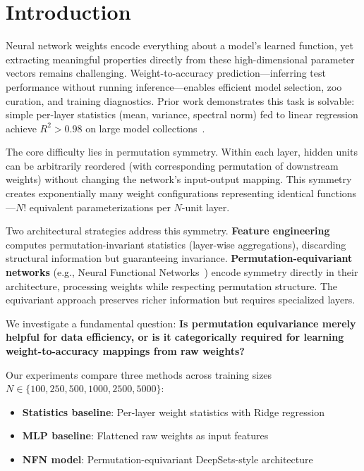 \section{Introduction}

Neural network weights encode everything about a model's learned function, yet extracting meaningful properties directly from these high-dimensional parameter vectors remains challenging. Weight-to-accuracy prediction---inferring test performance without running inference---enables efficient model selection, zoo curation, and training diagnostics. Prior work demonstrates this task is solvable: simple per-layer statistics (mean, variance, spectral norm) fed to linear regression achieve $R^2 > 0.98$ on large model collections~\cite{unterthiner2020predicting}.

The core difficulty lies in permutation symmetry. Within each layer, hidden units can be arbitrarily reordered (with corresponding permutation of downstream weights) without changing the network's input-output mapping. This symmetry creates exponentially many weight configurations representing identical functions---$N!$ equivalent parameterizations per $N$-unit layer.

Two architectural strategies address this symmetry. \textbf{Feature engineering} computes permutation-invariant statistics (layer-wise aggregations), discarding structural information but guaranteeing invariance. \textbf{Permutation-equivariant networks} (e.g., Neural Functional Networks~\cite{zhou2023neural}) encode symmetry directly in their architecture, processing weights while respecting permutation structure. The equivariant approach preserves richer information but requires specialized layers.

We investigate a fundamental question: \textbf{Is permutation equivariance merely helpful for data efficiency, or is it categorically required for learning weight-to-accuracy mappings from raw weights?}

Our experiments compare three methods across training sizes $N \in \{100, 250, 500, 1000, 2500, 5000\}$:
\begin{itemize}
    \item \textbf{Statistics baseline}: Per-layer weight statistics with Ridge regression
    \item \textbf{MLP baseline}: Flattened raw weights as input features
    \item \textbf{NFN model}: Permutation-equivariant DeepSets-style architecture
\end{itemize}

